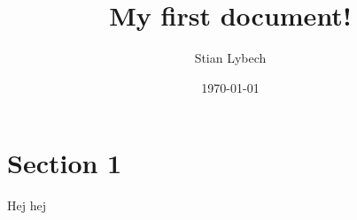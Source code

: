 \documentclass[a4paper,oneside,11pt,final]{memoir}
\title{My first document!}
\author{Stian Lybech}
\date{\today}
\begin{document}
\begin{titlingpage}
\maketitle
\end{titlingpage}

\section{Section 1}
Hej hej
\end{document}
